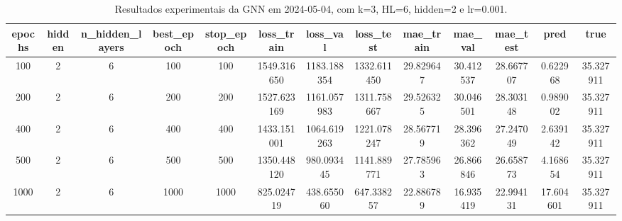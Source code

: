 \begin{table}[h]
\centering
\caption{Resultados experimentais da GNN em 2024-05-04, com k=3, HL=6, hidden=2 e lr=0.001.}
\label{tab:gnn_results_k3_hl6_h2_d20240504}
\begin{tabular}{ccccccccccccc}
\toprule
epochs & hidden & n\_hidden\_layers & best\_epoch & stop\_epoch & loss\_train & loss\_val & loss\_test & mae\_train & mae\_val & mae\_test & pred & true \\
\midrule
100 & 2 & 6 & 100 & 100 & 1549.316650 & 1183.188354 & 1332.611450 & 29.829647 & 30.412537 & 28.667707 & 0.622968 & 35.327911 \\
200 & 2 & 6 & 200 & 200 & 1527.623169 & 1161.057983 & 1311.758667 & 29.526325 & 30.046501 & 28.303148 & 0.989002 & 35.327911 \\
400 & 2 & 6 & 400 & 400 & 1433.151001 & 1064.619263 & 1221.078247 & 28.567719 & 28.396362 & 27.247049 & 2.639142 & 35.327911 \\
500 & 2 & 6 & 500 & 500 & 1350.448120 & 980.093445 & 1141.889771 & 27.785963 & 26.866846 & 26.658773 & 4.168654 & 35.327911 \\
1000 & 2 & 6 & 1000 & 1000 & 825.024719 & 438.655060 & 647.338257 & 22.886789 & 16.935419 & 22.994131 & 17.604601 & 35.327911 \\
\bottomrule
\end{tabular}
\end{table}
